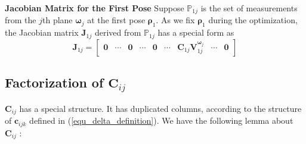 \documentclass{vgtc}                          %
\begin{document}
\textbf{Jacobian Matrix  for the First Pose} \quad
Suppose $\mathbb{P}_{1j}$ is the set of measurements from the $j$th plane $\bm{\omega}_{j}$ at the first pose  $\bm{\rho}_1$. As we fix $\bm{\rho}_1$  during the optimization, the Jacobian matrix $\mathbf{J}_{1j} $ derived from $\mathbb{P}_{1j}$  has a special form as
\begin{equation} \label{equ_J1j}
\mathbf{J}_{1j} =\begin{bmatrix}
\mathbf{0} & \cdots & \mathbf{0} &  \cdots  & \mathbf{0} & \cdots & \mathbf{C}_{1j}\bm{V}^{{\bm{\omega}}_{j}}_{1j} & \cdots  & \mathbf{0}
\end{bmatrix}
\end{equation}
\subsection{Factorization of $\mathbf{C}_{ij}$  }
 $\mathbf{C}_{ij}$ has a special structure. It has duplicated columns, according to the structure of $\mathbf{c}_{ijk}$ defined in (\ref{equ_delta_definition}).  We have the following lemma about $\mathbf{C}_{ij}$ :
\end{document}
